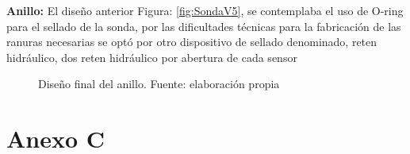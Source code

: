 \begin{appendices}
\textbf{Anillo: }
El diseño anterior Figura: \ref{fig:SondaV5}, se contemplaba el uso de O-ring para el sellado de la sonda, por las dificultades t\'ecnicas para la fabricaci\'on de las ranuras necesarias se opt\'o por otro dispositivo de sellado denominado,  reten hidr\'aulico, dos reten hidr\'aulico por abertura de cada sensor
\\
\begin{figure}[ht]
\centering
{}
\caption{Dise\~no final del anillo. Fuente: elaboración propia}
\label{fig:Anillo2019_anexo}
\end{figure}

\chapter*{Anexo C}
\label{appendix: c}
\setcounter{figure}{0}    


\end{appendices}
